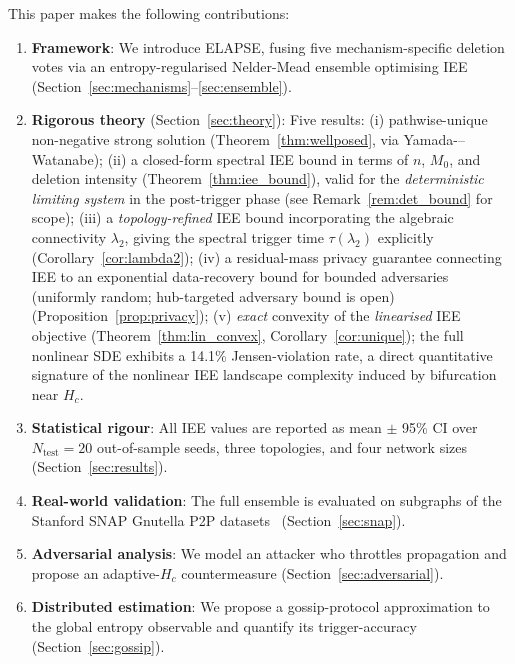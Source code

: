 \documentclass[review,12pt]{elsarticle}
\newcommand{\Hc}{H_c}
\begin{document}
This paper makes the following contributions:
\begin{enumerate}
  \item \textbf{Framework}: We introduce ELAPSE, fusing five mechanism-specific
        deletion votes via an entropy-regularised Nelder-Mead ensemble optimising
        IEE (Section~\ref{sec:mechanisms}--\ref{sec:ensemble}).
  \item \textbf{Rigorous theory} (Section~\ref{sec:theory}):
        Five results: (i) pathwise-unique non-negative strong solution
        (Theorem~\ref{thm:wellposed}, via Yamada-–Watanabe);
        (ii) a closed-form spectral IEE bound in terms of $n$, $M_0$,
        and deletion intensity (Theorem~\ref{thm:iee_bound}), valid for the \emph{deterministic limiting system} in the post-trigger phase (see Remark~\ref{rem:det_bound} for scope);
        (iii) a \emph{topology-refined} IEE bound incorporating the
        algebraic connectivity $\lambda_2$, giving the spectral trigger
        time $\tau(\lambda_2)$ explicitly (Corollary~\ref{cor:lambda2});
        (iv) a residual-mass privacy guarantee connecting IEE to an
        exponential data-recovery bound for bounded adversaries
        (uniformly random; hub-targeted adversary bound is open)
        (Proposition~\ref{prop:privacy});
        (v) \emph{exact} convexity of the \emph{linearised} IEE objective
        (Theorem~\ref{thm:lin_convex}, Corollary~\ref{cor:unique});
        the full nonlinear SDE exhibits a 14.1\% Jensen-violation rate,
        a direct quantitative signature of the nonlinear IEE landscape
        complexity induced by bifurcation near $\Hc$.
  \item \textbf{Statistical rigour}: All IEE values are reported as
        mean $\pm$ 95\% CI over $N_{\mathrm{test}} = 20$ out-of-sample seeds,
        three topologies, and four network sizes (Section~\ref{sec:results}).
  \item \textbf{Real-world validation}: The full ensemble is evaluated on
        subgraphs of the Stanford SNAP Gnutella P2P
        datasets~\cite{snapnets} (Section~\ref{sec:snap}).
  \item \textbf{Adversarial analysis}: We model an attacker who throttles
        propagation and propose an adaptive-$\Hc$ countermeasure
        (Section~\ref{sec:adversarial}).
  \item \textbf{Distributed estimation}: We propose a gossip-protocol
        approximation to the global entropy observable and quantify its
        trigger-accuracy (Section~\ref{sec:gossip}).
\end{enumerate}
\end{document}
